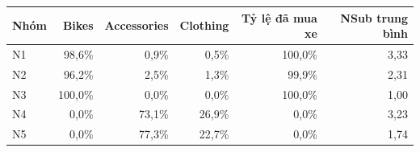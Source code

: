 \begin{tabular}{lrrrrr}
\toprule
Nhóm & Bikes & Accessories & Clothing & Tỷ lệ đã mua xe & NSub trung bình \\
\midrule
N1 & 98,6\% & 0,9\% & 0,5\% & 100,0\% & 3,33 \\
N2 & 96,2\% & 2,5\% & 1,3\% & 99,9\% & 2,31 \\
N3 & 100,0\% & 0,0\% & 0,0\% & 100,0\% & 1,00 \\
N4 & 0,0\% & 73,1\% & 26,9\% & 0,0\% & 3,23 \\
N5 & 0,0\% & 77,3\% & 22,7\% & 0,0\% & 1,74 \\
\bottomrule
\end{tabular}
